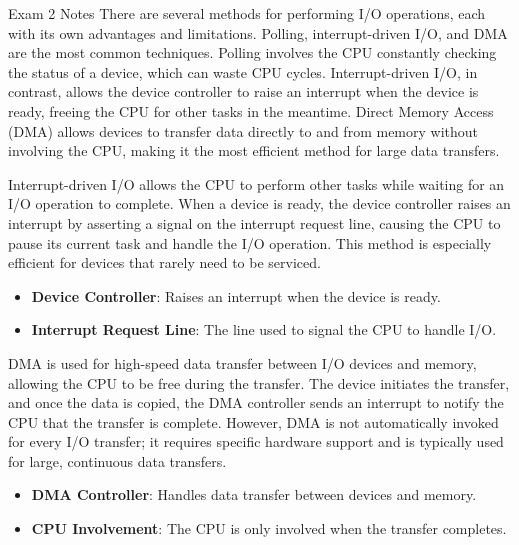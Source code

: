 \begin{examnotes}{Exam 2 Notes}
    There are several methods for performing I/O operations, each with its own advantages and limitations. Polling, interrupt-driven I/O, and DMA are the most common techniques. Polling involves the CPU 
    constantly checking the status of a device, which can waste CPU cycles. Interrupt-driven I/O, in contrast, allows the device controller to raise an interrupt when the device is ready, freeing the CPU 
    for other tasks in the meantime. Direct Memory Access (DMA) allows devices to transfer data directly to and from memory without involving the CPU, making it the most efficient method for large data transfers.
    
    \begin{highlight}
        Interrupt-driven I/O allows the CPU to perform other tasks while waiting for an I/O operation to complete. When a device is ready, the device controller raises an interrupt by asserting a signal 
        on the interrupt request line, causing the CPU to pause its current task and handle the I/O operation. This method is especially efficient for devices that rarely need to be serviced.
        \begin{itemize}
            \item \textbf{Device Controller}: Raises an interrupt when the device is ready.
            \item \textbf{Interrupt Request Line}: The line used to signal the CPU to handle I/O.
        \end{itemize}
    \end{highlight}
    
    \begin{highlight}
        DMA is used for high-speed data transfer between I/O devices and memory, allowing the CPU to be free during the transfer. The device initiates the transfer, and once the data is copied, the DMA 
        controller sends an interrupt to notify the CPU that the transfer is complete. However, DMA is not automatically invoked for every I/O transfer; it requires specific hardware support and is 
        typically used for large, continuous data transfers.
        \begin{itemize}
            \item \textbf{DMA Controller}: Handles data transfer between devices and memory.
            \item \textbf{CPU Involvement}: The CPU is only involved when the transfer completes.
        \end{itemize}
    \end{highlight}
    

\end{examnotes}
